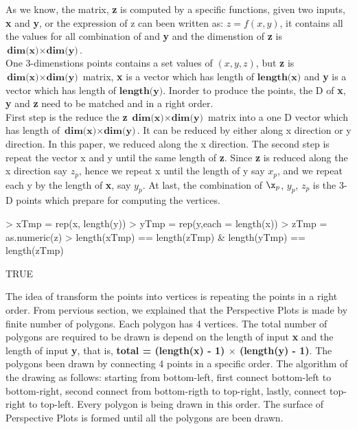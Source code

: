 \documentclass[paper=a4, fontsize=11pt]{report}
\begin{document}
As we know, the matrix, \textbf{z} is computed by a specific functions, given two inputs, \textbf{x} and \textbf{y}, or the expression of z can been written as: $z = f(x,y)$, it contains all the values for all combination of  and \textbf{y} and the dimenstion of \textbf{z} is $ \textbf{dim(x)} \times \textbf{dim(y)}$.\\

One 3-dimenstions points contains a set values of $(x, y, z)$, but \textbf{z} is $\textbf{dim(x)} \times \textbf{dim(y)}$ matrix, \textbf{x} is a vector which has length of $\textbf{length(x)}$ and \textbf{y} is a vector which has length of $\textbf{length(y)}$. Inorder to produce the points, the D of \textbf{x}, \textbf{y} and \textbf{z} need to be matched and in a right order.\\

First step is the reduce the \textbf{z} $\textbf{dim(x)} \times \textbf{dim(y)}$ matrix into a one D vector which has length of $\textbf{dim(x)} \times \textbf{dim(y)}$. It can be reduced by either along x direction or y direction. In this paper, we reduced along the x direction. The second step is repeat the vector x and y until the same length of \textbf{z}. Since \textbf{z} is reduced along the x direction say $z_p$, hence we repeat x until the length of y say $x_p$, and we repeat each y by the length of \textbf{x}, say $y_p$. At last, the combination of $\x_p$, $y_p$, $z_p$ is the 3-D points which prepare for computing the vertices. \\
\begin{Schunk}
\begin{Sinput}
> xTmp = rep(x, length(y))
> yTmp = rep(y,each = length(x))
> zTmp = as.numeric(z)
> length(xTmp) == length(zTmp) & length(yTmp) == length(zTmp)
\end{Sinput}
\begin{Soutput}
[1] TRUE
\end{Soutput}
\end{Schunk}

The idea of transform the points into vertices is repeating the points in a right order. From pervious section, we explained that the Perspective Plots is made by finite number of polygons. Each polygon has 4 vertices. The total number of polygons are required to be drawn is depend on the length of input \textbf{x} and the length of input \textbf{y}, that is, \textbf{total = (length(x) - 1) $\times$ (length(y) - 1)}. The polygons been drawn by connecting 4 points in a specific order. The algorithm of the drawing as follows: starting from bottom-left, first connect bottom-left to bottom-right, second connect from bottom-rigth to top-right, lastly, connect top-right to top-left. Every polygon is being drawn in this order. The surface of Perspective Plots is formed until all the polygons are been drawn. \\
\end{document}
